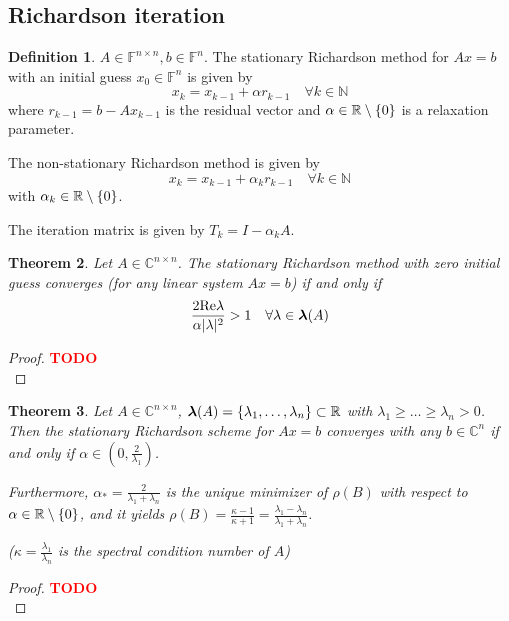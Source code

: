 \documentclass[12pt]{article}
\newcounter{lecture}
\newtheorem{theorem}{Theorem}[lecture]
\theoremstyle{definition}
\newtheorem{definition}[theorem]{Definition}
\theoremstyle{remark}
\numberwithin{equation}{section}
\newcommand{\F}{\mathbb{F}}
\newcommand{\R}{\mathbb{R}}
\newcommand{\C}{\mathbb{C}}
\newcommand{\N}{\mathbb{N}}
\renewcommand{\Re}{\textnormal{Re}}
\newcommand{\spectrum}[1]{\bm{\lambda}(#1)}
\newcommand{\TODO}[1][]{\textcolor{red}{\textbf{TODO\ifblank{#1}{}{:\ }#1}}\\}
\DeclarePairedDelimiter{\set}{\{}{\}}
\begin{document}
\subsection{Richardson iteration}
\begin{definition}
  $A \in \F^{n\times n}, b \in \F^n$. The stationary Richardson method for $Ax=b$ with an initial guess $x_0 \in \F^n$ is given by
  \begin{equation*}
    x_k = x_{k-1} + \alpha r_{k-1} \quad \forall k \in \N
  \end{equation*}
  where $r_{k-1} = b - Ax_{k-1}$ is the residual vector and $\alpha \in \R\setminus\set{0}$ is a relaxation parameter.

  The non-stationary Richardson method is given by
  \begin{equation*}
    x_k = x_{k-1} + \alpha_k r_{k-1} \quad \forall k \in \N
  \end{equation*}
  with $\alpha_k \in \R\setminus\set{0}$.

  The iteration matrix is given by $T_k = I - \alpha_k A$.
\end{definition}
\begin{theorem}
  Let $A \in \C^{n\times n}$. The stationary Richardson method with zero initial guess converges (for any linear system $Ax = b$) if and only if
  \begin{equation*}
    \frac{2 \Re \lambda}{\alpha |\lambda|^2} > 1 \quad \forall \lambda \in \spectrum{A}
  \end{equation*}
\end{theorem}
\begin{proof}
  \TODO
\end{proof}

\begin{theorem}
  Let $A \in \C^{n\times n}$, $\spectrum{A} = \set{\lambda_1,\ldots,\lambda_n} \subset \R$ with $\lambda_1 \geq \ldots \geq \lambda_n > 0$. Then the stationary Richardson scheme for $Ax = b$ converges with any $b \in \C^n$ if and only if $\alpha \in (0, \frac{2}{\lambda_1})$.

  Furthermore, $\alpha_* = \frac{2}{\lambda_1+\lambda_n}$ is the unique minimizer of $\rho(B)$ with respect to $\alpha \in \R\setminus\set{0}$, and it yields $\rho(B) = \frac{\kappa - 1}{\kappa + 1} = \frac{\lambda_1 - \lambda_n}{\lambda_1 + \lambda_n}$.

  ($\kappa = \frac{\lambda_1}{\lambda_n}$ is the spectral condition number of $A$)
\end{theorem}
\begin{proof}
  \TODO
\end{proof}
\end{document}
